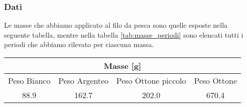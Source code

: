 \subsubsection{Dati}

Le masse che abbiamo applicato al filo da pesca sono quelle esposte nella seguente tabella,
mentre nella tabella \ref{tab:masse_periodi} sono elencati tutti i periodi che abbiamo rilevato per ciascuna massa.

\begin{center}
	\begin{tabular}{c c c c}
			\multicolumn{4}{c}{\textbf{Masse [g]}} \\
	        \toprule
	        Peso Bianco & Peso Argenteo & Peso Ottone piccolo & Peso Ottone \\
	        \midrule
	        88.9 & 162.7 & 202.0 & 670.4 \\ 
	        \bottomrule
	\end{tabular}
\end{center}


